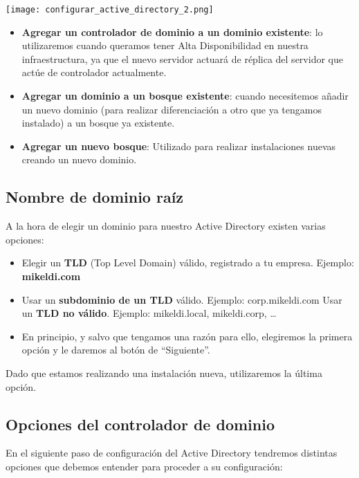 \begin{center}
    \vspace{-15pt}
    \texttt{[image: configurar\_active\_directory\_2.png]}
    \vspace{-15pt}
\end{center}

\begin{itemize}
    \item \textbf{Agregar un controlador de dominio a un dominio existente}: lo utilizaremos cuando queramos tener Alta Disponibilidad en nuestra infraestructura, ya que el nuevo servidor actuará de réplica del servidor que actúe de controlador actualmente.
    \item \textbf{Agregar un dominio a un bosque existente}: cuando necesitemos añadir un nuevo dominio (para realizar diferenciación a otro que ya tengamos instalado) a un bosque ya existente.
    \item \textbf{Agregar un nuevo bosque}: Utilizado para realizar instalaciones nuevas creando un nuevo dominio.
\end{itemize}

\subsection{Nombre de dominio raíz}
A la hora de elegir un dominio para nuestro Active Directory existen varias opciones:

\begin{itemize}
    \item Elegir un \textbf{TLD} (Top Level Domain) válido, registrado a tu empresa. Ejemplo: \textbf{mikeldi.com}
    \item Usar un \textbf{subdominio de un TLD} válido. Ejemplo: corp.mikeldi.com
    Usar un \textbf{TLD no válido}. Ejemplo: mikeldi.local, mikeldi.corp, …
    \item En principio, y salvo que tengamos una razón para ello, elegiremos la primera opción y le daremos al botón de “Siguiente”.
\end{itemize}

Dado que estamos realizando una instalación nueva, utilizaremos la última opción.

\subsection{Opciones del controlador de dominio}
En el siguiente paso de configuración del Active Directory tendremos distintas opciones que debemos entender para proceder a su configuración:

